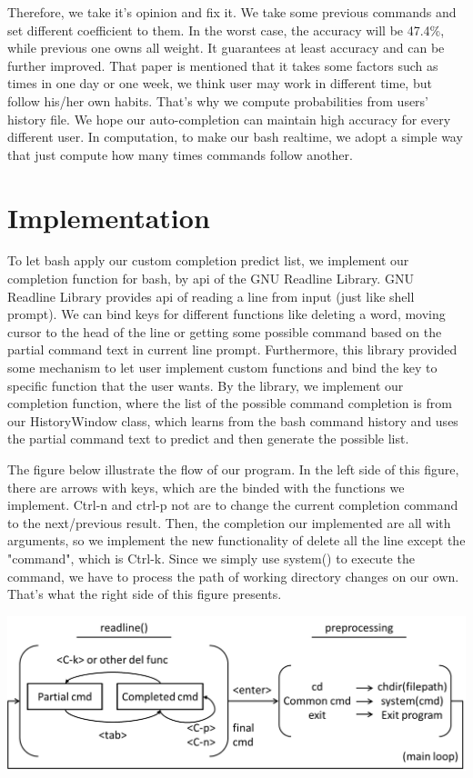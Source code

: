 \documentclass[11pt,a4paper]{article}
\begin{document}
Therefore, we take it's opinion and fix it. 
We take some previous commands and set different coefficient to them. 
In the worst case, the accuracy will be 47.4\%, while previous one owns all weight. 
It guarantees at least accuracy and can be further improved. 
That paper is mentioned that it takes some factors such as times in one day or one week, 
we think user may work in different time, but follow his/her own habits.
That's why we compute probabilities from users' history file. 
We hope our auto-completion can maintain high accuracy for every different user. 
In computation, to make our bash realtime, we adopt a simple way that just compute how many times commands follow another. 



\section*{Implementation}
To let bash apply our custom completion predict list, 
we implement our completion function for bash, by api of the GNU Readline Library. 
GNU Readline Library provides api of reading a line from input (just like shell prompt).
We can bind keys for different functions like deleting a word, 
moving cursor to the head of the line or getting some possible command 
based on the partial command text in current line prompt. 
Furthermore, this library provided some mechanism to let user implement custom functions 
and bind the key to specific function that the user wants. 
By the library, we implement our completion function, 
where the list of the possible command completion is from our HistoryWindow class, 
which learns from the bash command history and uses the partial command text 
to predict and then generate the possible list.
\par
The figure below illustrate the flow of our program.
In the left side of this figure, there are arrows with keys, 
which are the binded with the functions we implement. 
Ctrl-n and ctrl-p not are to change the current completion command to the next/previous result.
Then, the completion our implemented are all with arguments, so we implement the new functionality of delete
all the line except the "command", which is Ctrl-k.
Since we simply use system() to execute the command, 
we have to process the path of working directory changes on our own.
That's what the right side of this figure presents.
\\
\begin{center}
\includegraphics[scale=0.6]{pic.png}
\end{center}
\end{document}
